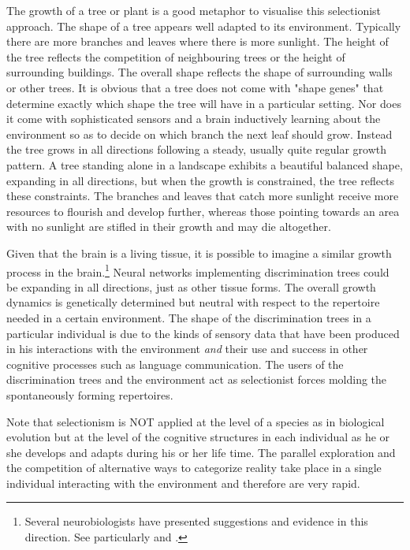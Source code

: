 The growth of a tree or plant is a good 
metaphor to visualise this selectionist approach. 
The shape of a tree appears well adapted to 
its environment. Typically there are more branches and leaves 
where there is more sunlight. The height of
the tree reflects the competition of neighbouring trees
or the height of surrounding buildings. The overall shape reflects
the shape of surrounding walls or other trees. 
It is obvious that a tree
does not come with "shape genes" that determine
exactly which shape the tree will have in a particular 
setting. Nor does it come with sophisticated sensors
and a brain inductively learning about the environment
so as to decide on which branch the next leaf should grow. 
Instead the tree grows in all directions following
a steady, usually quite regular growth pattern. A tree
standing alone in a landscape exhibits a beautiful 
balanced shape, expanding in all directions, but when the 
growth is constrained, the tree reflects these constraints. 
The branches and leaves that catch more sunlight receive more resources 
to flourish and develop further, whereas those 
pointing towards an area with no sunlight are stifled in 
their growth and may die altogether.  

Given that the brain is a living tissue, it is possible 
to imagine a similar growth process in the brain.\footnote{
Several neurobiologists have presented 
suggestions and evidence in this direction. See 
particularly \cite{Edelman:1987} and \cite{Changeux:1997}.}
Neural networks implementing discrimination trees could be expanding
in all directions, just as other
tissue forms. The overall growth dynamics is 
genetically determined but neutral with respect to 
the repertoire needed in a certain environment. 
The shape of the discrimination trees in a particular 
individual is due to the kinds of sensory 
data that have been produced in his interactions with
the environment {\itshape and} their use and success
in other cognitive processes such as language
communication. The
users of the discrimination trees and the environment act
as selectionist forces molding the spontaneously forming 
repertoires.

Note that selectionism is NOT applied at 
the level of a species as in biological evolution but 
at the level of the cognitive structures in each individual
as he or she develops and adapts during his or her life 
time. The parallel exploration and the competition of 
alternative ways to categorize reality take 
place in a single individual interacting with the environment
and therefore are very rapid.

